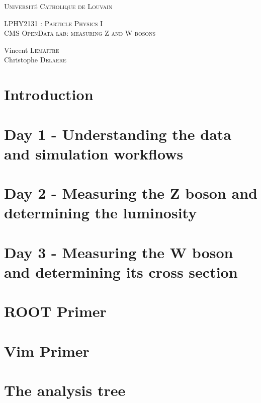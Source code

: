 \documentclass[a4paper]{scrartcl}
\begin{document}
\def\w{\par \vspace{\baselineskip}}
\begin{titlepage}
\begin{center}
\textsc{\Large Université Catholique de Louvain }\\[0.5cm]
\w
\w
\textsc{\huge LPHY2131 : Particle Physics I }\\[0.34cm]
\textsc{\large CMS OpenData lab: measuring Z and W bosons}\\[0.7cm]
\w
\begin{minipage}{0.6\textwidth}
\begin{center}
\large
Vincent \textsc{Lemaitre}\\
Christophe \textsc{Delaere}\\
\end{center}
\end{minipage} 
\end{center}
\end{titlepage}

\tableofcontents
\newpage

\section{Introduction}

\newpage

\section{Day 1 - Understanding the data and simulation workflows}

\newpage

\section{Day 2 - Measuring the Z boson and determining the luminosity}

\newpage

\section{Day 3 - Measuring the W boson and determining its cross section}

\newpage

\section{ROOT Primer}

\newpage

\section{Vim Primer}

\newpage

\section{The analysis tree}

\newpage
\end{document}
